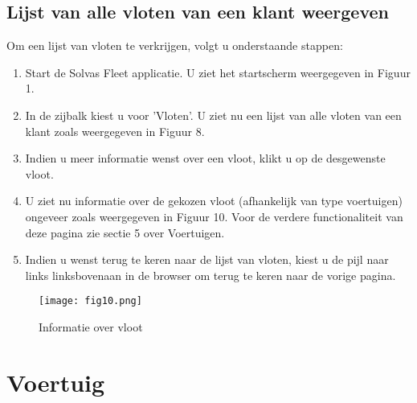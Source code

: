 \documentclass[11pt,openany]{article}
\begin{document}
\subsection{Lijst van alle vloten van een klant weergeven}
Om een lijst van vloten te verkrijgen, volgt u onderstaande stappen:
\begin{enumerate}
	\item Start de Solvas Fleet applicatie. U ziet het startscherm weergegeven in Figuur 1.
	\item In de zijbalk kiest u voor 'Vloten'. U ziet nu een lijst van alle vloten van een klant zoals weergegeven in Figuur 8.
	\item Indien u meer informatie wenst over een vloot, klikt u op de desgewenste vloot. 
	\item U ziet nu informatie over de gekozen vloot (afhankelijk van type voertuigen)
	ongeveer zoals weergegeven in Figuur 10. Voor de verdere functionaliteit van deze pagina zie sectie 5 over Voertuigen. 
	\item Indien u wenst terug te keren naar de lijst van vloten, kiest u de pijl naar links  linksbovenaan in de browser om terug te keren naar de vorige pagina.
\end{enumerate}

\begin{figure}
	\centering
	\texttt{[image: fig10.png]}
	\caption{Informatie over vloot}
\end{figure}

\newpage
\section{Voertuig}
\end{document}
